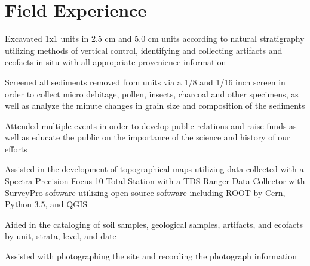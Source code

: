 \documentclass[letterpaper]{resume}
\begin{document}
\section{Field Experience}

\begin{compactitem}
\item Excavated 1x1 units in 2.5 cm and 5.0 cm units according to natural stratigraphy utilizing methods of vertical control, identifying and collecting artifacts and ecofacts in situ with all appropriate provenience information
\item Screened all sediments removed from units via a 1/8 and 1/16 inch screen in order to collect micro debitage, pollen, insects, charcoal and other specimens, as well as analyze the minute changes in grain size and composition of the sediments
\item Attended multiple events in order to develop public relations and raise funds as well as educate the public on the importance of the science and history of our efforts
\item Assisted in the development of topographical maps utilizing data collected with a Spectra Precision Focus 10 Total Station with a TDS Ranger Data Collector with SurveyPro software utilizing open source software including ROOT by Cern, Python 3.5, and QGIS
\item Aided in the cataloging of soil samples, geological samples, artifacts, and ecofacts  by unit, strata, level, and date
\item Assisted with photographing the site and recording the photograph information
\end{compactitem}
\end{document}
